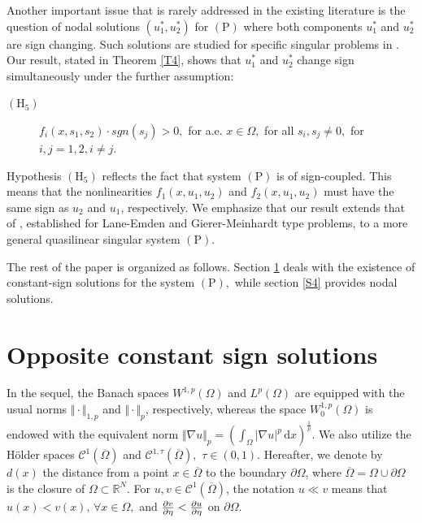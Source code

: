 \documentclass[11pt]{amsart}
\theoremstyle{definition}
\theoremstyle{remark}
\numberwithin{equation}{section}
\begin{document}
Another important issue that is rarely addressed in the existing literature
is the question of nodal solutions $(u_{1}^{\ast },u_{2}^{\ast })$ for $(%
\mathrm{P})$ where both components $u_{1}^{\ast }$ and $u_{2}^{\ast }$ are
sign changing. Such solutions are studied for specific singular problems in 
\cite{M, M3, M4}. Our result, stated in Theorem \ref{T4}, shows that $%
u_{1}^{\ast }$ and $u_{2}^{\ast }$ change sign simultaneously under the
further assumption:

\begin{description}
\item[$(\mathrm{H}_{5})$] $f_{i}(x,s_{1},s_{2})\cdot sgn(s_{j})>0,$ for a.e. 
$x\in \Omega ,$ for all $s_{i},s_{j}\neq 0,$ for $i,j=1,2,i\neq j$.
\end{description}

Hypothesis $(\mathrm{H}_{5})$ reflects the fact that system $(\mathrm{P})$
is of sign-coupled. This means that the nonlinearities $f_{1}(x,u_{1},u_{2})$
and $f_{2}(x,u_{1},u_{2})$ must have the same sign as $u_{2}$ and $u_{1}$,
respectively. We emphasize that our result extends that of \cite{M3, M4},
established for Lane-Emden and Gierer-Meinhardt type problems, to a more
general quasilinear singular system $(\mathrm{P})$.

The rest of the paper is organized as follows. Section \ref{S2} deals with
the existence of constant-sign solutions for the system $(\mathrm{P}),$
while section \ref{S4} provides nodal solutions.

\section{Opposite constant sign solutions}

\label{S2}

In the sequel, the Banach spaces $W^{1,p}(\Omega )$ and $L^{p}(\Omega )$ are
equipped with the usual norms $\Vert \cdot \Vert _{1,p}$ and $\Vert \cdot
\Vert _{p}$, respectively, whereas the space $W_{0}^{1,p}(\Omega )$ is
endowed with the equivalent norm $\Vert \nabla u\Vert _{p}=(\int_{\Omega
}|\nabla u|^{p}\,\mathrm{d}x)^{\frac{1}{p}}$. We also utilize the H\"{o}lder
spaces $\mathcal{C}^{1}(\overline{\Omega })$ and $\mathcal{C}^{1,\tau }(%
\overline{\Omega }),$ $\tau \in (0,1)$. Hereafter, we denote by $d(x)$ the
distance from a point $x\in \overline{\Omega }$ to the boundary $\partial
\Omega $, where $\overline{\Omega }=\Omega \cup \partial \Omega $ is the
closure of $\Omega \subset 
\mathbb{R}
^{N}$. For $u,v\in \mathcal{C}^{1}(\overline{\Omega })$, the notation $u\ll
v $ means that $u(x)<v(x),\,\forall x\in \Omega ,$ and $\frac{\partial v}{%
\partial \eta }<\frac{\partial u}{\partial \eta }$ on $\partial \Omega .$
\end{document}

